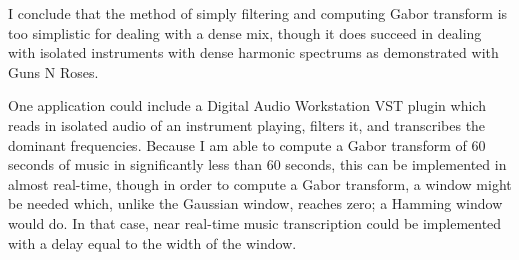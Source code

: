 \documentclass{article}
\begin{document}
I conclude that the method of simply filtering and computing Gabor transform is too simplistic for dealing with a dense mix, though it does succeed in dealing with isolated instruments with dense harmonic spectrums as demonstrated with Guns N Roses.


One application could include a Digital Audio Workstation VST plugin which reads in isolated audio of an instrument playing, filters it, and transcribes the dominant frequencies. Because I am able to compute a Gabor transform of 60 seconds of music in significantly less than 60 seconds, this can be implemented in almost real-time, though in order to compute a Gabor transform, a window might be needed which, unlike the Gaussian window, reaches zero; a Hamming window would do. In that case, near real-time music transcription could be implemented with a delay equal to the width of the window.  

\printbibliography
\end{document}

